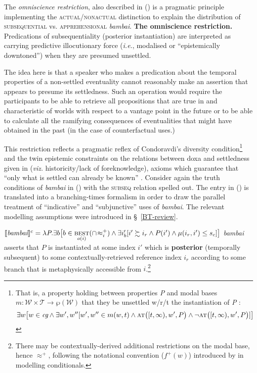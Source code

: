  

The \textit{omniscience restriction}, also described in () is a pragmatic principle implementing the \textsc{actual/nonactual} distinction to explain the distribution of \textsc{subsequential} vs. \textsc{apprehensional} \textit{bambai}.
\pex \textbf{The omniscience restriction.}
Predications of subsequentiality (posterior instantiation) are interpreted as carrying predictive illocutionary force (\textit{i.e.}, modalised or ``epistemically downtoned'') when they are presumed unsettled.
\xe

The idea here is that a speaker who makes a predication about the temporal properties of a non-settled eventuality cannot reasonably make an assertion that appears to presume its settledness.
Such an operation would require the participants to be able to retrieve all propositions that are true in and characteristic of worlds with respect to a vantage point in the future or to be able to calculate all the ramifying consequences of eventualities that might have obtained in the past (in the case of counterfactual uses.)


This restriction reflects a pragmatic reflex of Condoravdi's \citeyearpar[83]{Condoravdi2002}  diversity condition\footnote{That is, a property holding between properties \textit{P} and modal bases $ m:\mathcal{W\times T\to\wp(\mathcal W)} $ that they be unsettled w/r/t the instantiation of \textit{P} \citep[83]{Condoravdi2002}:
$$\exists w\big[w\in\textit{cg}\wedge\exists w',w''[w',w''\in m(w,t)\wedge\textsc{at}\big([t,\infty),w',P\big)\wedge\neg \textsc{at}\big([t,\infty),w',P\big)]\big]$$} and the twin epistemic constraints on the relations between doxa and settledness given in \citealt{Kaufmann2002,Kaufmann2005,Kaufmann2006} (\textit{viz.} historicity/lack of foreknowledge), axioms which guarantee that ``only what is settled can already be known'' \citep[101]{Kaufmann2006}. Consider again the truth conditions of \textit{bambai} in () with the \textsc{subseq} relation spelled out. The entry in () is translated into a branching-times formalism in order to draw the parallel treatment of ``indicative'' and ``subjunctive'' uses of \textit{bambai}. The relevant modelling assumptions were introduced in \S~\ref{BT-review}.

\pex{}
$ \denote[c]{\textit{bambai}}=\lambda\textit{P}.\exists b
\big[b\in\underset{o(i)}{\textsc{best}}(\cap\!\approx_i^+)\wedge \exists i'_b[i'\succsim i_r\wedge P(i')\wedge\mu(i_r,i')\leq s_c]\big] $
\textit{bambai} asserts that $ \mathit P $ is instantiated at some index $ i' $ which is \textbf{posterior} (temporally subsequent) to some contextually-retrieved reference index $ i_r $ according to some branch that is metaphysically accessible from $ i $.\footnote{There may be contextually-derived additional restrictions on the modal base, hence $ \boldsymbol{\approx^+} $, following the notational convention ($ f^+(w) $) introduced by \citet{Kratzer1981} in modelling conditionals.}

